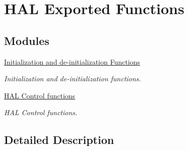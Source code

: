 \hypertarget{group___h_a_l___exported___functions}{}\section{H\+AL Exported Functions}
\label{group___h_a_l___exported___functions}
\subsection*{Modules}
\begin{DoxyCompactItemize}
\item 
\hyperlink{group___h_a_l___exported___functions___group1}{Initialization and de-\/initialization Functions}
\begin{DoxyCompactList}\small\item\em Initialization and de-\/initialization functions. \end{DoxyCompactList}\item 
\hyperlink{group___h_a_l___exported___functions___group2}{H\+A\+L Control functions}
\begin{DoxyCompactList}\small\item\em H\+AL Control functions. \end{DoxyCompactList}\end{DoxyCompactItemize}


\subsection{Detailed Description}
